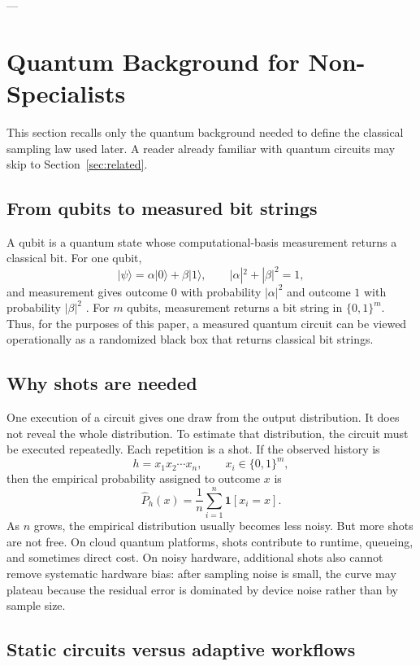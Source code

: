 ---
\section{Quantum Background for Non-Specialists}
\label{sec:background}
 
This section recalls only the quantum background needed to define the classical sampling law used later. A reader already familiar with quantum circuits may skip to Section~\ref{sec:related}.
 
\subsection{From qubits to measured bit strings}
 
A qubit is a quantum state whose computational-basis measurement returns a classical bit. For one qubit,
\[
|\psi\rangle = \alpha |0\rangle + \beta |1\rangle,
\qquad |\alpha|^2+|\beta|^2=1,
\]
and measurement gives outcome $0$ with probability $|\alpha|^2$ and outcome $1$ with probability $|\beta|^2$ \cite{nielsen2010quantum}. For $m$ qubits, measurement returns a bit string in $\{0,1\}^m$. Thus, for the purposes of this paper, a measured quantum circuit can be viewed operationally as a randomized black box that returns classical bit strings.
 

\subsection{Why shots are needed}
 
One execution of a circuit gives one draw from the output distribution. It does not reveal the whole distribution. To estimate that distribution, the circuit must be executed repeatedly. Each repetition is a shot. If the observed history is
\[
 h=x_1x_2\cdots x_n,\qquad x_i\in \{0,1\}^m,
\]
then the empirical probability assigned to outcome $x$ is
\[
 \widehat P_h(x)=\frac{1}{n}\sum_{i=1}^n \mathbf 1[x_i=x].
\]
As $n$ grows, the empirical distribution usually becomes less noisy. But more shots are not free. On cloud quantum platforms, shots contribute to runtime, queueing, and sometimes direct cost. On noisy hardware, additional shots also cannot remove systematic hardware bias: after sampling noise is small, the curve may plateau because the residual error is dominated by device noise rather than by sample size.
 
\subsection{Static circuits versus adaptive workflows}
 
